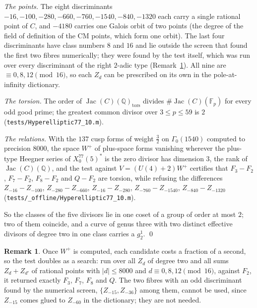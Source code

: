 \documentclass[11pt,reqno]{amsart}
\theoremstyle{plain}
\theoremstyle{definition}
\newtheorem{remark}[theorem]{Remark}
\DeclareMathOperator{\Jac}{Jac}
\newcommand{\Q}{\mathbb{Q}}
\newcommand{\F}{\mathbb{F}}
\begin{document}
\emph{The points.} The eight discriminants $-16,-100,-280,-660,-760,-1540,-840,-1320$ each carry a
single rational point of $C$, and $-4180$ carries one Galois orbit of two points (the degree of the
field of definition of the CM points, which form one orbit). The last four discriminants have class
numbers $8$ and $16$ and lie outside the screen that found the first two fibres numerically; they
were found by the test itself, which was run over every discriminant of the right $2$-adic type
(Remark~\ref{rem:scan}). All nine are $\equiv0,8,12\pmod{16}$, so each $Z_d$ can be prescribed on
its own in the pole-at-infinity dictionary.

\emph{The torsion.} The order of $\Jac(C)(\Q)_{\mathrm{tors}}$ divides $\#\Jac(C)(\F_p)$ for every
odd good prime; the greatest common divisor over $3\le p\le59$ is $2$
(\texttt{tests/Hyperelliptic77\_10.m}).

\emph{The relations.} With the $137$ cusp forms of weight $\tfrac32$ on $\Gamma_0(1540)$ computed to
precision $8000$, the space $W^+$ of plus-space forms vanishing wherever the plus-type Heegner
series of $X_0^{77}(5)^*$ is the zero divisor has dimension $3$, the rank of $\Jac(C)(\Q)$, and the
test against $V=(U(4)+2)W^+$ certifies that $F_3-F_2$, $F_7-F_2$, $F_8-F_2$ and $Q-F_2$ are torsion,
while refusing the differences $Z_{-16}-Z_{-100}$, $Z_{-280}-Z_{-660}$, $Z_{-16}-Z_{-280}$,
$Z_{-760}-Z_{-1540}$, $Z_{-840}-Z_{-1320}$ (\texttt{tests/\_offline/Hyperelliptic77\_10.m}).

So the classes of the five divisors lie in one coset of a group of order at most $2$; two of them
coincide, and a curve of genus three with two distinct effective divisors of degree two in one
class carries a $g^1_2$. \qed

\begin{remark}\label{rem:scan}
Once $W^+$ is computed, each candidate costs a fraction of a second, so the test doubles as a
search: run over all $Z_d$ of degree two and all sums $Z_d+Z_{d'}$ of rational points with
$|d|\le8000$ and $d\equiv0,8,12\pmod{16}$, against $F_2$, it returned exactly $F_3$, $F_7$, $F_8$
and $Q$. The two fibres with an odd discriminant found by the numerical screen,
$\{Z_{-15},Z_{-36}\}$ among them, cannot be used, since $Z_{-15}$ comes glued to $Z_{-60}$ in the
dictionary; they are not needed.
\end{remark}
\end{document}
